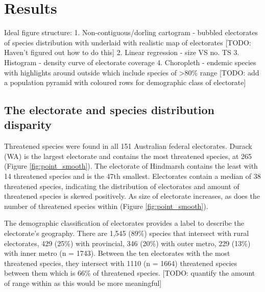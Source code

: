 \documentclass[a4paper,11pt]{article}
\begin{document}
\section{Results}

Ideal figure structure:
1. Non-contiguous/dorling cartogram - bubbled electorates of species distribution with underlaid with realistic map of electorates [TODO: Haven't figured out how to do this]
2. Linear regression - size VS no. TS
3. Histogram - density curve of electorate coverage
4. Choropleth - endemic species with highlights around outside which include species of >80\% range [TODO: add a population pyramid with coloured rows for demographic class of electorate]

\subsection{The electorate and species distribution disparity}

Threatened species were found in all 151 Australian federal electorates. Durack (WA) is the largest electorate and contains the most threatened species, at 265 (Figure \ref{fig:point_smooth}). The electorate of Hindmarsh contains the least with 14 threatened species and is the 47th smallest. Electorates contain a median of 38 threatened species, indicating the distribution of electorates and amount of threatened species is skewed positively. As size of electorate increases, as does the number of threatened species within (Figure \ref{fig:point_smooth}).

The demographic classification of electorates provides a label to describe the electorate's geography. There are 1,545 (89\%) species that intersect with rural electorates, 429 (25\%) with provincial, 346 (20\%) with outer metro, 229 (13\%) with inner metro (n = 1743). Between the ten electorates with the most threatened species, they intersect with 1110 (n = 1664) threatened species between them which is 66\% of threatened species. 
[TODO: quantify the amount of range within as this would be more meaningful]

\end{document}

